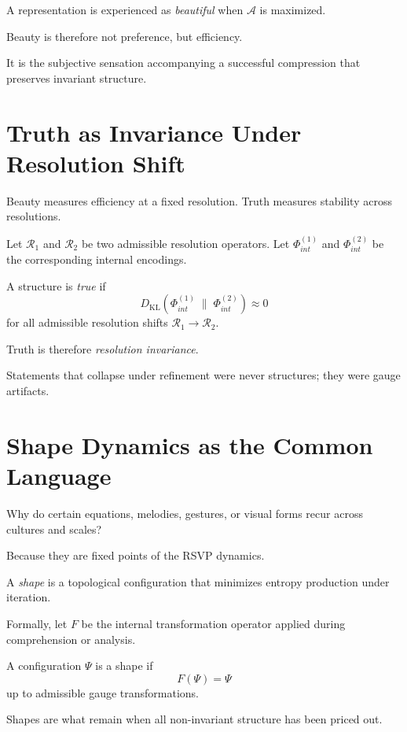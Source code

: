 \documentclass[11pt]{book}
\begin{document}
A representation is experienced as \emph{beautiful} when \(\mathcal{A}\) is
maximized.

Beauty is therefore not preference, but efficiency.

It is the subjective sensation accompanying a successful compression that
preserves invariant structure.

\section{Truth as Invariance Under Resolution Shift}

Beauty measures efficiency at a fixed resolution.
Truth measures stability across resolutions.

Let \(\mathcal{R}_1\) and \(\mathcal{R}_2\) be two admissible resolution operators.
Let \(\Phi_{int}^{(1)}\) and \(\Phi_{int}^{(2)}\) be the corresponding internal
encodings.

\begin{definition}
A structure is \emph{true} if
\[
D_{\mathrm{KL}}\!\left(
\Phi_{int}^{(1)} \;\|\; \Phi_{int}^{(2)}
\right)
\approx 0
\]
for all admissible resolution shifts \(\mathcal{R}_1 \to \mathcal{R}_2\).
\end{definition}

Truth is therefore \emph{resolution invariance}.

Statements that collapse under refinement were never structures; they were
gauge artifacts.

\section{Shape Dynamics as the Common Language}

Why do certain equations, melodies, gestures, or visual forms recur across
cultures and scales?

Because they are fixed points of the RSVP dynamics.

A \emph{shape} is a topological configuration that minimizes entropy production
under iteration.

Formally, let \(F\) be the internal transformation operator applied during
comprehension or analysis.

\begin{definition}
A configuration \(\Psi\) is a shape if
\[
F(\Psi) = \Psi
\]
up to admissible gauge transformations.
\end{definition}

Shapes are what remain when all non-invariant structure has been priced out.
\end{document}
